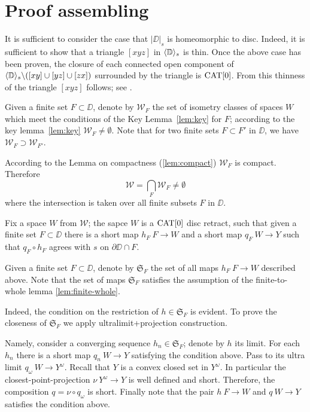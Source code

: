 \section{Proof assembling}\label{Main theorem}



It is sufficient to consider
the case that $|\DD|_s$ is  homeomorphic to disc.
Indeed, it is sufficient to show that a triangle $[xyz]$ in $\langle\mathbb{D}\rangle_s$ is thin. 
Once the above case has been proven, the closure of each connected open component of $\langle\mathbb{D}\rangle_s\backslash ([xy]\cup[yz]\cup[zx])$
surrounded by the triangle is $\mathop{\rm CAT}\nolimits[0]$.
From this thinness of the triangle $[xyz]$ follows; see \cite{bishop}.


Given a finite set $F\subset \DD$,
denote by $\mathcal{W}_F$
the set of isometry classes of spaces $W$ which meet the conditions of the Key Lemma~\ref{lem:key}
for $F$;
according to the key lemma~\ref{lem:key} $\mathcal{W}_F\ne\emptyset$.
Note that for two finite sets $F\subset F'$ in $\DD$,
we have $\mathcal{W}_F\supset \mathcal{W}_{F'}$.

According to the Lemma on compactness (\ref{lem:compact}) $\mathcal{W}_F$ is compact.
Therefore 
\[\mathcal{W}
=
\bigcap_{F}\mathcal{W}_F\ne \emptyset\]
where the intersection is taken over all finite subsets $F$ in $\DD$. 


Fix a space $W$ from $\mathcal{W}$;
the sapce $W$ is a $\mathop{\rm CAT}\nolimits[0]$ disc retract,
such that given a finite set $F\subset \DD$ there is a short map $h_F\:F\to W$ 
and a short map $q_F\:W\to Y$ such that $q_F\circ h_F$ agrees with $s$ on $\partial\DD\cap F$.

Given a finite set $F\subset \DD$,
denote by $\mathfrak{S}_F$ the set of all maps $h_F\:F\to W$ described above.
Note that the set of maps $\mathfrak{S}_F$ satisfies the assumption of the finite-to-whole lemma \ref{lem:finite-whole}.

Indeed, the condition on the restriction of $h\in  \mathfrak{S}_F$ is evident.
To prove the closeness of $\mathfrak{S}_F$ we apply ultralimit+projection construction.

Namely, consider a converging sequence $h_n\in  \mathfrak{S}_F$;
denote by $h$ its limit.
For each $h_n$ there is a short map $q_n\:W\to Y$ satisfying the condition above.
Pass to its ultra limit $q_\omega\:W\to Y^\omega$.
Recall that $Y$ is a convex closed set in $Y^\omega$.
In particular the closest-point-projection $\nu\:Y^\omega\to Y$ is well defined and short.
Therefore, the composition $q=\nu\circ q_\omega$ is short.
Finally note that the pair $h\:F\to W$ and $q\:W\to Y$ satisfies the condition above.

